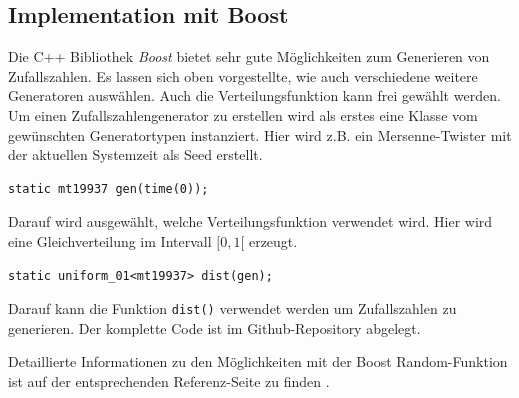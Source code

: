 \documentclass{book}
\begin{document}
\begin{refsection}
\subsection{Implementation mit Boost}
Die C++ Bibliothek \textit{Boost} bietet sehr gute Möglichkeiten zum Generieren von Zufallszahlen. Es lassen sich oben vorgestellte, wie auch verschiedene weitere Generatoren auswählen. Auch die Verteilungsfunktion kann frei gewählt werden. \\

Um einen Zufallszahlengenerator zu erstellen wird als erstes eine Klasse vom gewünschten Generatortypen instanziert. Hier wird z.B. ein Mersenne-Twister mit der aktuellen Systemzeit als Seed erstellt.

\begin{lstlisting}[style=C]
static mt19937 gen(time(0));
\end{lstlisting}

Darauf wird ausgewählt, welche Verteilungsfunktion verwendet wird. Hier wird eine Gleichverteilung im Intervall $[0,1[$ erzeugt. 

\begin{lstlisting}[style=C]
static uniform_01<mt19937> dist(gen); 
\end{lstlisting}

Darauf kann die Funktion \texttt{dist()} verwendet werden um Zufallszahlen zu generieren. Der komplette Code ist im Github-Repository \cite{rng:githubRepo} abgelegt.

Detaillierte Informationen zu den Möglichkeiten mit der Boost Random-Funktion ist auf der entsprechenden Referenz-Seite zu finden \cite{rng:boostRandom}.


\newpage
\printbibliography[heading=subbibliography]
\end{refsection}
\end{document}
